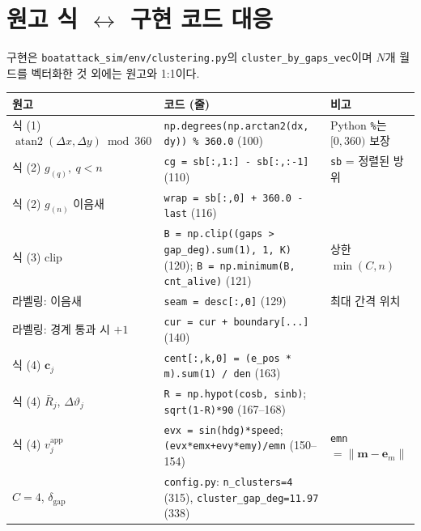 \documentclass[11pt,a4paper]{article}
\newcommand{\vt}{\vartheta}
\newcommand{\bfe}{\mathbf{e}}
\newcommand{\bfm}{\mathbf{m}}
\newcommand{\bfc}{\mathbf{c}}
\newcommand{\vapp}{v^{\mathrm{app}}}
\newcommand{\dgap}{\delta_{\mathrm{gap}}}
\begin{document}
\appendix
\section{원고 식 $\leftrightarrow$ 구현 코드 대응}

구현은 \texttt{boatattack\_sim/env/clustering.py}의 \texttt{cluster\_by\_gaps\_vec}이며 $N$개 월드를 벡터화한 것 외에는 원고와 1:1이다.
\begin{table}[H]
\footnotesize
\begin{tabularx}{\textwidth}{>{\raggedright\arraybackslash}p{} >{\raggedright\arraybackslash}X >{\raggedright\arraybackslash}p{}}
\toprule
원고 & 코드 (줄) & 비고 \\
\midrule
식 (1) $\operatorname{atan2}(\Delta x,\Delta y) \bmod 360$ & \texttt{np.degrees(np.arctan2(dx, dy)) \% 360.0} (100) & Python \texttt{\%}는 $[0,360)$ 보장 \\
식 (2) $g_{(q)},\ q<n$ & \texttt{cg = sb[:,1:] - sb[:,:-1]} (110) & \texttt{sb} = 정렬된 방위 \\
식 (2) $g_{(n)}$ 이음새 & \texttt{wrap = sb[:,0] + 360.0 - last} (116) & \\
식 (3) clip & \texttt{B = np.clip((gaps > gap\_deg).sum(1), 1, K)} (120); \texttt{B = np.minimum(B, cnt\_alive)} (121) & 상한 $\min(C,n)$ \\
라벨링: 이음새 & \texttt{seam = desc[:,0]} (129) & 최대 간격 위치 \\
라벨링: 경계 통과 시 $+1$ & \texttt{cur = cur + boundary[...]} (140) & \\
식 (4) $\bfc_j$ & \texttt{cent[:,k,0] = (e\_pos * m).sum(1) / den} (163) & \\
식 (4) $\bar R_j$, $\Delta\vt_j$ & \texttt{R = np.hypot(cosb, sinb)}; \texttt{sqrt(1-R)*90} (167--168) & \\
식 (4) $\vapp_j$ & \texttt{evx = sin(hdg)*speed}; \texttt{(evx*emx+evy*emy)/emn} (150--154) & \texttt{emn} $=\lVert\bfm-\bfe_m\rVert$ \\
$C=4$, $\dgap$ & \texttt{config.py}: \texttt{n\_clusters=4} (315), \texttt{cluster\_gap\_deg=11.97} (338) & \\
\bottomrule
\end{tabularx}
\end{table}
\end{document}
